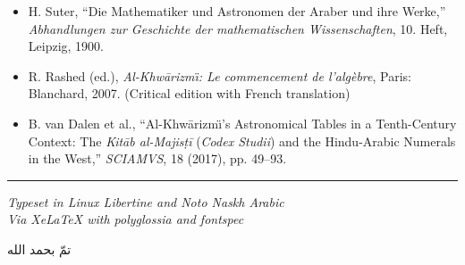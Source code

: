\documentclass[11pt,a4paper,openany,oneside]{book}
\begin{document}
\begin{small}
\begin{itemize}[leftmargin=2em]
  \item H. Suter, ``Die Mathematiker und Astronomen der Araber und ihre
  Werke,'' \textit{Abhandlungen zur Geschichte der mathematischen
  Wissenschaften}, 10. Heft, Leipzig, 1900.
  
  \item R. Rashed (ed.), \textit{Al-Khw\=arizm\"{\i}: Le commencement de
  l'alg\`ebre}, Paris: Blanchard, 2007. (Critical edition with French
  translation)
  
  \item B. van Dalen et al., ``Al-Khw\=arizm\"{\i}'s Astronomical Tables in
  a Tenth-Century Context: The \textit{Kit\=ab al-Majis\d{t}\=i}
  (\textit{Codex Studii}) and the Hindu-Arabic Numerals in the West,''
  \textit{SCIAMVS}, 18 (2017), pp. 49--93.
\end{itemize}
\end{small}

\vfill

\begin{center}
\rule{0.3\textwidth}{0.4pt}

\vspace{0.3cm}

{\small\textit{Typeset in Linux Libertine and Noto Naskh Arabic}}\\[0.1cm]
{\small\textit{Via XeLaTeX with polyglossia and fontspec}}

\vspace{0.3cm}

\begin{arabicbox}[boxrule=0pt,colback=white,width=0.6\textwidth]
\begin{center}
\begin{Arabic}
تمّ بحمد الله
\end{Arabic}
\end{center}
\end{arabicbox}
\end{center}
\end{document}
